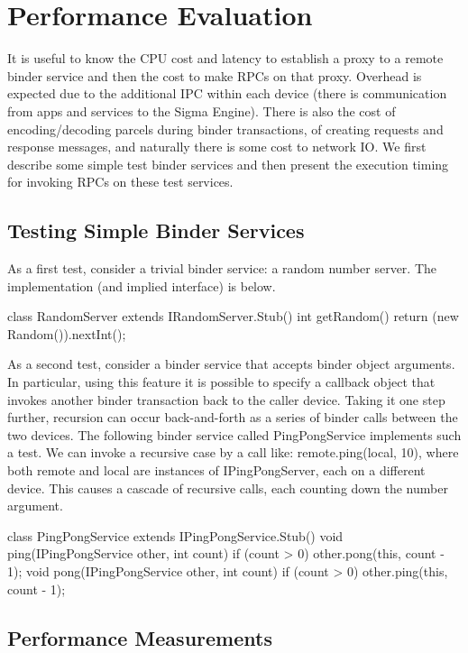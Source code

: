 \documentclass[prodmode]{acmlarge}
\begin{document}
\section{Performance Evaluation}
\label{sec:Performance}
It is useful to know the CPU cost and latency to establish a proxy to a remote binder service and then the cost to make RPCs on that proxy. Overhead is expected due to the additional IPC within each device (there is communication from apps and services to the Sigma Engine). There is also the cost of encoding/decoding parcels during binder transactions, of creating requests and response messages, and naturally there is some cost to network IO. We first describe some simple test binder services and then present the execution timing for invoking RPCs on these test services.

\subsection{Testing Simple Binder Services}
As a first test, consider a trivial binder service: a random number server. The implementation (and implied interface) is below.

\begin{snippet}
class RandomServer extends IRandomServer.Stub() {
  int getRandom() { return (new Random()).nextInt(); }}
\end{snippet}

As a second test, consider a binder service that accepts binder object arguments. In particular, using this feature it is possible to specify a callback object that invokes another binder transaction back to the caller device. Taking it one step further, recursion can occur back-and-forth as a series of binder calls between the two devices. The following binder service called PingPongService implements such a test. We can invoke a recursive case by a call like: remote.ping(local, 10), where both remote and local are instances of IPingPongServer, each on a different device. This causes a cascade of recursive calls, each counting down the number argument.

\begin{snippet}
class PingPongService extends IPingPongService.Stub() {
  void ping(IPingPongService other, int count) {
    if (count > 0) other.pong(this, count - 1);
  }
  void pong(IPingPongService other, int count) {
    if (count > 0) other.ping(this, count - 1);
  }
}
\end{snippet}

\subsection{Performance Measurements}
\end{document}
